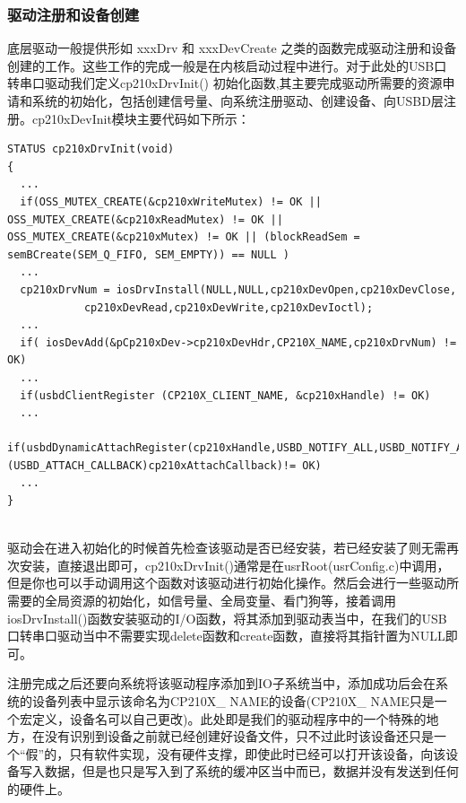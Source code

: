 \subsubsection{驱动注册和设备创建} 
	
	底层驱动一般提供形如 xxxDrv 和 xxxDevCreate 之类的函数完成驱动注册和设备创建的工作。这些工作的完成一般是在内核启动过程中进行。对于此处的USB口转串口驱动我们定义cp210xDrvInit() 初始化函数,其主要完成驱动所需要的资源申请和系统的初始化，包括创建信号量、向系统注册驱动、创建设备、向USBD层注册。cp210xDevInit模块主要代码如下所示：
\lstset{language=C}
\begin{lstlisting}
STATUS cp210xDrvInit(void)
{
  ...
  if(OSS_MUTEX_CREATE(&cp210xWriteMutex) != OK || OSS_MUTEX_CREATE(&cp210xReadMutex) != OK || OSS_MUTEX_CREATE(&cp210xMutex) != OK || (blockReadSem = semBCreate(SEM_Q_FIFO, SEM_EMPTY)) == NULL )
  ... 	
  cp210xDrvNum = iosDrvInstall(NULL,NULL,cp210xDevOpen,cp210xDevClose,
			cp210xDevRead,cp210xDevWrite,cp210xDevIoctl);
  ...
  if( iosDevAdd(&pCp210xDev->cp210xDevHdr,CP210X_NAME,cp210xDrvNum) != OK)
  ...  
  if(usbdClientRegister (CP210X_CLIENT_NAME, &cp210xHandle) != OK)
  ...  
  if(usbdDynamicAttachRegister(cp210xHandle,USBD_NOTIFY_ALL,USBD_NOTIFY_ALL,USBD_NOTIFY_ALL,TRUE,(USBD_ATTACH_CALLBACK)cp210xAttachCallback)!= OK)
  ...
}
\end{lstlisting}\\

	驱动会在进入初始化的时候首先检查该驱动是否已经安装，若已经安装了则无需再次安装，直接退出即可，cp210xDrvInit()通常是在usrRoot(usrConfig.c)中调用，但是你也可以手动调用这个函数对该驱动进行初始化操作。然后会进行一些驱动所需要的全局资源的初始化，如信号量、全局变量、看门狗等，接着调用iosDrvInstall()函数安装驱动的I/O函数，将其添加到驱动表当中，在我们的USB口转串口驱动当中不需要实现delete函数和create函数，直接将其指针置为NULL即可。
	
	注册完成之后还要向系统将该驱动程序添加到IO子系统当中，添加成功后会在系统的设备列表中显示该命名为CP210X\_ NAME的设备(CP210X\_ NAME只是一个宏定义，设备名可以自己更改)。此处即是我们的驱动程序中的一个特殊的地方，在没有识别到设备之前就已经创建好设备文件，只不过此时该设备还只是一个“假”的，只有软件实现，没有硬件支撑，即使此时已经可以打开该设备，向该设备写入数据，但是也只是写入到了系统的缓冲区当中而已，数据并没有发送到任何的硬件上。

